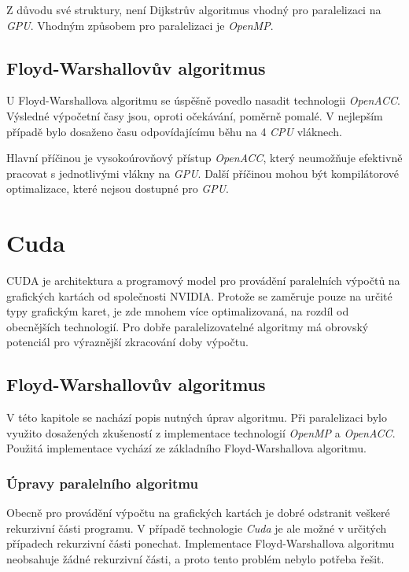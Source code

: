 \documentclass[a4paper,11pt]{article}
\begin{document}
  Z důvodu své struktury, není Dijkstrův algoritmus vhodný pro paralelizaci na \textit{GPU}. Vhodným způsobem pro
  paralelizaci je \textit{OpenMP}.
 
 \subsection{Floyd-Warshallovův algoritmus}
   U Floyd-Warshallova algoritmu se úspěšně povedlo nasadit technologii \textit{OpenACC}. Výsledné výpočetní časy jsou,
   oproti očekávání, poměrně pomalé. V nejlepším případě bylo dosaženo času odpovídajícímu běhu na 4 \textit{CPU} vláknech.
   
   Hlavní příčinou je vysokoúrovňový přístup \textit{OpenACC}, který neumožňuje efektivně pracovat s jednotlivými
   vlákny na \textit{GPU}. Další příčinou mohou být kompilátorové optimalizace, které nejsou dostupné pro \textit{GPU}.
   
    \section{Cuda} 
    CUDA  je architektura a programový model pro provádění paralelních
    výpočtů na grafických kartách od společnosti NVIDIA. 
    Protože se zaměruje pouze na určité typy grafickým karet, je zde mnohem více optimalizovaná, na rozdíl
    od obecnějších technologií. Pro dobře paralelizovatelné algoritmy má obrovský potenciál
    pro výraznější zkracování doby výpočtu.
    
    \subsection{Floyd-Warshallovův algoritmus}
    V této kapitole se nachází popis nutných úprav algoritmu. Při paralelizaci bylo využito dosažených
    zkušeností z implementace technologií \textit{OpenMP} a \textit{OpenACC}. Použitá implementace vychází ze základního 
    Floyd-Warshallova algoritmu.
    
    \subsubsection{Úpravy paralelního algoritmu}
    Obecně pro provádění výpočtu na grafických kartách je dobré odstranit veškeré rekurzivní části programu.
    V případě technologie \textit{Cuda} je ale možné v určitých případech rekurzivní části ponechat. 
    Implementace Floyd-War\-shallova algoritmu neobsahuje žádné rekurzivní části, a proto tento problém nebylo 
    potřeba řešit. 
    
\end{document}
